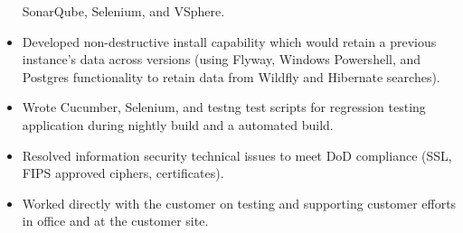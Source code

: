 \documentclass[12pt, line, margin]{res}
\begin{document}
\begin{resume}
\begin{itemize}
		        SonarQube, Selenium, and VSphere.
	      \item   Developed non-destructive install capability which would retain \newline
                         a previous instance's data across versions (using Flyway, Windows \newline
                         Powershell, and Postgres functionality to retain data from Wildfly and 
                         Hibernate searches).
              \item   Wrote Cucumber, Selenium, and testng test scripts for regression \newline
			testing application during nightly build and a automated \newline 
			build.
	      \item   Resolved information security technical issues to meet DoD \newline
			compliance (SSL, FIPS approved ciphers, certificates).
	      \item   Worked directly with the customer on testing and supporting \newline
			customer efforts in office and at the customer site.
                \end{itemize}
 
\pagebreak


\end{resume}
\end{document}
